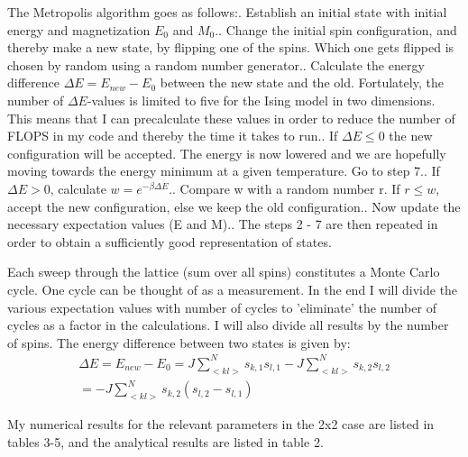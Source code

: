 \documentclass[twocolumn]{article}
\begin{document}
The Metropolis algorithm goes as follows:. Establish an initial state  with initial energy and magnetization $E_0$ and $M_0$.. Change the initial spin configuration, and thereby make a new state, by flipping one of the spins. Which one gets flipped is chosen by random using a random number generator.. Calculate the energy difference $\Delta E = E_{new} - E_0$ between the new state and the old. Fortulately, the number of $\Delta E$-values is limited to five for the Ising model in two dimensions. This means that I can precalculate these values in order to reduce the number of FLOPS in my code and thereby the time it takes to run.. If $\Delta E \leq 0$ the new configuration will be accepted. The energy is now lowered and we are hopefully moving towards the energy minimum at a given temperature. Go to step 7.. If $\Delta E > 0$, calculate $w = e^{-\beta \Delta E}$.. Compare w with a random number r. If $r \leq w$, accept the new configuration, else we keep the old configuration.. Now update the necessary expectation values (E and M).. The steps 2 - 7 are then repeated in order to obtain a sufficiently good representation of states.\newline

Each sweep through the lattice (sum over all spins) constitutes a Monte Carlo cycle. One cycle can be thought of as a measurement. In the end I will divide the various expectation values with number of cycles to 'eliminate' the number of cycles as a factor in the calculations. I will also divide all results by the number of spins.\newline
The energy difference between two states is given by:
\begin{equation}
\begin{multlined}
\Delta E = E_{new} - E_0 = J \sum_{<kl>}^{N} s_{k,1}s_{l,1} - J\sum_{<kl>}^{N} s_{k,2}s_{l,2}\\ = -J \sum_{<kl>}^{N} s_{k,2}(s_{l,2} - s_{l,1})
\end{multlined}
\end{equation}

My numerical results for the relevant parameters in the 2x2 case are listed in tables 3-5, and the analytical results are listed in table 2.
\newline
\end{document}
